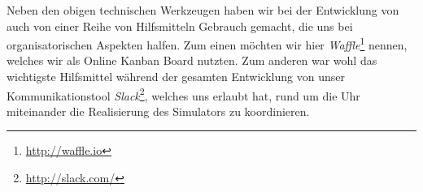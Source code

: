 Neben den obigen technischen Werkzeugen haben wir bei der Entwicklung von
\erasim{} auch von einer Reihe von Hilfsmitteln Gebrauch gemacht, die uns bei
organisatorischen Aspekten halfen. Zum einen möchten wir hier
\emph{Waffle}\footnote{\url{http://waffle.io}} nennen, welches wir als Online
Kanban Board nutzten. Zum anderen war wohl das wichtigste Hilfsmittel während
der gesamten Entwicklung von \erasim{} unser Kommunikationstool
\emph{Slack}\footnote{\url{http://slack.com/}}, welches uns erlaubt hat, rund um
die Uhr miteinander die Realisierung des Simulators zu koordinieren.
